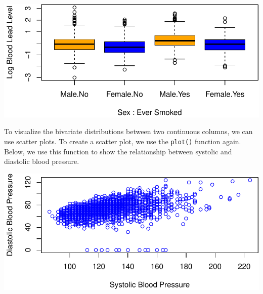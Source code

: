 \documentclass[
  letterpaper,
]{krantz}
\makeatletter
\newenvironment{Shaded}{\begin{snugshade}}{\end{snugshade}}
\newcommand{\AttributeTok}[1]{\textcolor[rgb]{0.40,0.45,0.13}{#1}}
\newcommand{\FunctionTok}[1]{\textcolor[rgb]{0.28,0.35,0.67}{#1}}
\newcommand{\NormalTok}[1]{\textcolor[rgb]{0.00,0.23,0.31}{#1}}
\newcommand{\SpecialCharTok}[1]{\textcolor[rgb]{0.37,0.37,0.37}{#1}}
\newcommand{\StringTok}[1]{\textcolor[rgb]{0.13,0.47,0.30}{#1}}
\newenvironment{kframe}{%
\medskip{}
\setlength{\fboxsep}{.8em}
 \def\at@end@of@kframe{}%
 \ifinner\ifhmode%
  \def\at@end@of@kframe{\end{minipage}}%
  \begin{minipage}{\columnwidth}%
 \fi\fi%
 \def\FrameCommand##1{\hskip\@totalleftmargin \hskip-\fboxsep
 \colorbox{shadecolor}{##1}\hskip-\fboxsep
     \hskip-\linewidth \hskip-\@totalleftmargin \hskip\columnwidth}%
 \MakeFramed {\advance\hsize-\width
   \@totalleftmargin\z@ \linewidth\hsize
   \@setminipage}}%
 {\par\unskip\endMakeFramed%
 \at@end@of@kframe}
\renewenvironment{Shaded}{\begin{kframe}}{\end{kframe}}
\makeatother
\begin{document}
\begin{center}
\includegraphics[width=1\textwidth,height=\textheight]{book/exploratory_analysis_files/figure-pdf/unnamed-chunk-16-1.pdf}
\end{center}

To visualize the bivariate distributions between two continuous columns,
we can use scatter plots. To create a scatter plot, we use the
\texttt{plot()} function again. Below, we use this function to show the
relationship between systolic and diastolic blood pressure.

\begin{Shaded}
\end{Shaded}

\begin{center}
\includegraphics[width=1\textwidth,height=\textheight]{book/exploratory_analysis_files/figure-pdf/unnamed-chunk-17-1.pdf}
\end{center}
\end{document}
